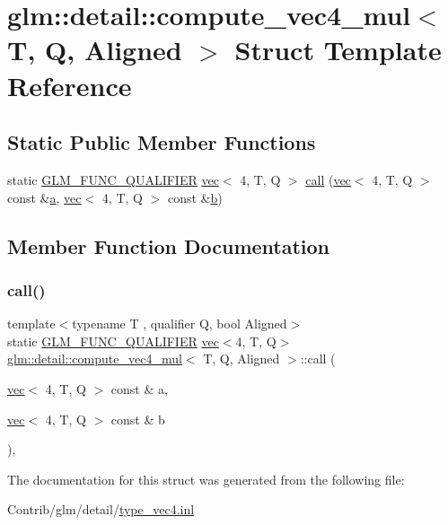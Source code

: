 \hypertarget{structglm_1_1detail_1_1compute__vec4__mul}{}\section{glm\+:\+:detail\+:\+:compute\+\_\+vec4\+\_\+mul$<$ T, Q, Aligned $>$ Struct Template Reference}
\label{structglm_1_1detail_1_1compute__vec4__mul}
\subsection*{Static Public Member Functions}
\begin{DoxyCompactItemize}
\item 
static \mbox{\hyperlink{setup_8hpp_a33fdea6f91c5f834105f7415e2a64407}{G\+L\+M\+\_\+\+F\+U\+N\+C\+\_\+\+Q\+U\+A\+L\+I\+F\+I\+ER}} \mbox{\hyperlink{structglm_1_1vec}{vec}}$<$ 4, T, Q $>$ \mbox{\hyperlink{structglm_1_1detail_1_1compute__vec4__mul_a349917211c527b2f0c2dc552932fce5b}{call}} (\mbox{\hyperlink{structglm_1_1vec}{vec}}$<$ 4, T, Q $>$ const \&\mbox{\hyperlink{_s_d_l__opengl__glext_8h_a3309789fc188587d666cda5ece79cf82}{a}}, \mbox{\hyperlink{structglm_1_1vec}{vec}}$<$ 4, T, Q $>$ const \&\mbox{\hyperlink{_s_d_l__opengl__glext_8h_a0f71581a41fd2264c8944126dabbd010}{b}})
\end{DoxyCompactItemize}


\subsection{Member Function Documentation}
\mbox{\label{structglm_1_1detail_1_1compute__vec4__mul_a349917211c527b2f0c2dc552932fce5b}} 
\subsubsection{\texorpdfstring{call()}{call()}}
{\footnotesize\ttfamily template$<$typename T , qualifier Q, bool Aligned$>$ \\
static \mbox{\hyperlink{setup_8hpp_a33fdea6f91c5f834105f7415e2a64407}{G\+L\+M\+\_\+\+F\+U\+N\+C\+\_\+\+Q\+U\+A\+L\+I\+F\+I\+ER}} \mbox{\hyperlink{structglm_1_1vec}{vec}}$<$4, T, Q$>$ \mbox{\hyperlink{structglm_1_1detail_1_1compute__vec4__mul}{glm\+::detail\+::compute\+\_\+vec4\+\_\+mul}}$<$ T, Q, Aligned $>$\+::call (\begin{DoxyParamCaption}\item[{\mbox{\hyperlink{structglm_1_1vec}{vec}}$<$ 4, T, Q $>$ const \&}]{a,  }\item[{\mbox{\hyperlink{structglm_1_1vec}{vec}}$<$ 4, T, Q $>$ const \&}]{b }\end{DoxyParamCaption})\hspace{0.3cm}{\ttfamily [inline]}, {\ttfamily [static]}}



The documentation for this struct was generated from the following file\+:\begin{DoxyCompactItemize}
\item 
Contrib/glm/detail/\mbox{\hyperlink{type__vec4_8inl}{type\+\_\+vec4.\+inl}}\end{DoxyCompactItemize}
